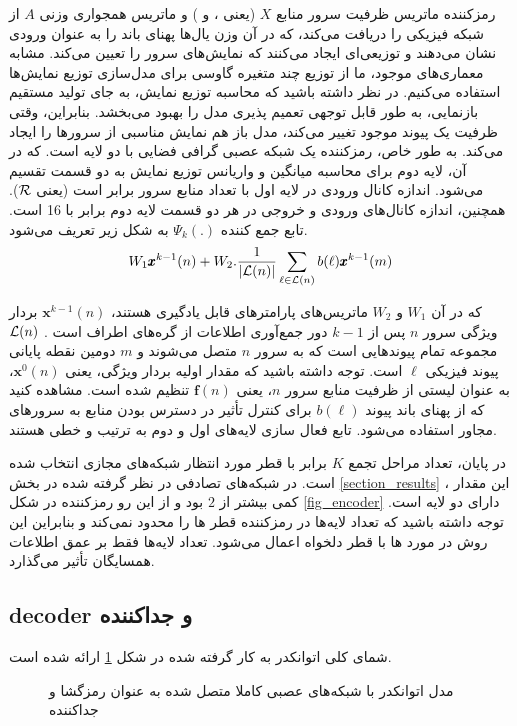رمزکننده ماتریس ظرفیت سرور منابع $ X $ (یعنی ،  و ) و ماتریس همجواری وزنی $ A $ از شبکه فیزیکی را دریافت می‌کند، که در آن وزن یال‌ها پهنای باند را به عنوان ورودی نشان می‌دهند و توزیعی‌ای ایجاد می‌کنند که نمایش‌های سرور را تعیین می‌کند.
مشابه معماری‌های موجود، ما از توزیع چند متغیره گاوسی برای مدل‌سازی توزیع نمایش‌ها استفاده می‌کنیم.
در نظر داشته باشید که محاسبه توزیع نمایش، به جای تولید مستقیم بازنمایی، به طور قابل توجهی تعمیم پذیری مدل را بهبود می‌بخشد. بنابراین، وقتی ظرفیت یک پیوند موجود تغییر می‌کند، مدل باز هم نمایش مناسبی از سرور‌ها را ایجاد می‌کند.
به طور خاص، رمز‌کننده یک شبکه عصبی گرافی فضایی با دو لایه است. که در آن، لایه دوم برای محاسبه میانگین و واریانس توزیع نمایش به دو قسمت تقسیم می‌شود.
اندازه کانال ورودی در لایه اول با تعداد منابع سرور برابر است (یعنی $\mathcal{R}$). همچنین، اندازه کانال‌های ورودی و خروجی در هر دو قسمت لایه دوم برابر با 16 است.
تابع جمع کننده  $\Psi_k(.)$  به شکل زیر تعریف می‌شود.
\begin{equation}
W_1 \pmb{x}^{k-1}(n) + W_2 . \frac{1}{|\mathcal{L}(n)|}
\sum_{\ell\in\mathcal{L}(n)} b(\ell) \pmb{x}^{k-1}(m)
\end{equation}

که در آن $ W_1 $ و $ W_2 $ ماتریس‌های پارامترهای قابل یادگیری هستند، $\pmb{x}^{k-1}(n)$ بردار ویژگی سرور $ n $ پس از $ k-1 $ دور جمع‌آوری اطلاعات از گره‌های اطراف است . $\mathcal{L}(n)$ مجموعه تمام پیوندهایی است که به سرور $ n $ متصل می‌شوند و $ m $ دومین نقطه پایانی پیوند فیزیکی $\ell$ است.
توجه داشته باشید که مقدار اولیه بردار ویژگی،  یعنی $\pmb{x}^{0}(n)$، به عنوان لیستی از ظرفیت منابع سرور $ n $، یعنی $\pmb{f}(n)$  تنظیم شده است. 
مشاهده کنید که از پهنای باند پیوند $b(\ell)$ برای کنترل تأثیر در دسترس بودن منابع به سرورهای مجاور استفاده می‌شود. تابع فعال سازی لایه‌های اول و دوم به ترتیب  و خطی هستند.


در پایان، تعداد مراحل تجمع $ K $ برابر با قطر مورد انتظار شبکه‌های مجازی انتخاب شده است. در شبکه‌های تصادفی در نظر گرفته شده در بخش 
\ref {section_results}
، این مقدار کمی بیشتر از $ 2 $ بود و از این رو رمزکننده در شکل 
 \ref {fig_encoder} 
 دارای دو لایه است. توجه داشته باشید که تعداد لایه‌ها در رمزکننده قطر ‌ها را محدود نمی‌کند و بنابراین این روش در مورد ‌ها با قطر دلخواه اعمال می‌شود. تعداد لایه‌ها فقط بر عمق اطلاعات همسایگان تأثیر می‌گذارد.
 
\subsection{\gls{decoder} و جداکننده}

شمای کلی اتوانکدر به کار گرفته شده در شکل \ref{fig_discriminator} ارائه شده است.
\begin{figure}[t]
	\centering
	\caption{مدل اتوانکدر با شبکه‌های عصبی کاملا متصل شده به عنوان رمزگشا و جداکننده }
	\label{fig_discriminator}
\end{figure}

